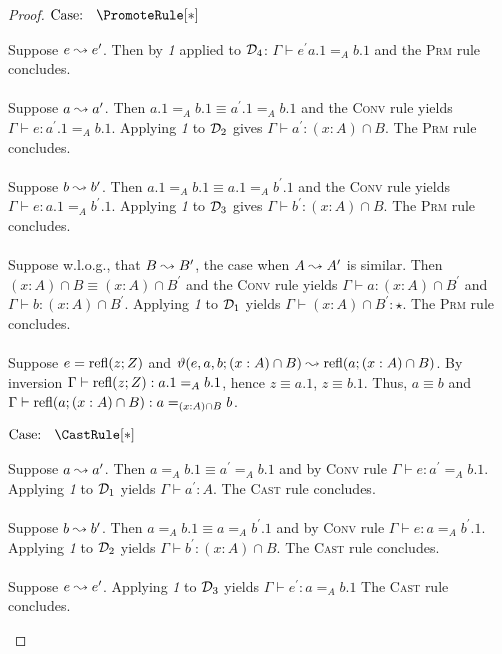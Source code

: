 \begin{proof}
    $\text{Case: }\begin{array}{c} \PromoteRule[*] \end{array}$
    \begin{proofcase}
        Suppose $e \leadsto e^\prime$.
        Then by \textit{1} applied to $\mathcal{D}_{4}$: $\Gamma \vdash e^\prime a.1 =_A b.1$ and the \textsc{Prm} rule concludes.
        \\ \\
        Suppose $a \leadsto a^\prime$.
        Then $a.1 =_A b.1 \equiv a^\prime.1 =_A b.1$ and the \textsc{Conv} rule yields $\Gamma \vdash e : a^\prime.1 =_A b.1$.
        Applying \textit{1} to $\mathcal{D}_{2}$ gives $\Gamma \vdash a^\prime : (x : A) \cap B$.
        The \textsc{Prm} rule concludes.
        \\ \\
        Suppose $b \leadsto b^\prime$.
        Then $a.1 =_A b.1 \equiv a.1 =_A b^\prime.1$ and the \textsc{Conv} rule yields $\Gamma \vdash e : a.1 =_A b^\prime.1$.
        Applying \textit{1} to $\mathcal{D}_{3}$ gives $\Gamma \vdash b^\prime : (x : A) \cap B$.
        The \textsc{Prm} rule concludes.
        \\ \\
        Suppose w.l.o.g., that $B \leadsto B^\prime$, the case when $A \leadsto A^\prime$ is similar.
        Then $(x : A) \cap B \equiv (x : A) \cap B^\prime$ and the \textsc{Conv} rule yields $\Gamma \vdash a : (x : A) \cap B^\prime$ and $\Gamma \vdash b : (x : A) \cap B^\prime$.
        Applying \textit{1} to $\mathcal{D}_{1}$ yields $\Gamma \vdash (x : A) \cap B^\prime : \star$.
        The \textsc{Prm} rule concludes.
        \\ \\
        Suppose $e = \textnormal{refl}(z;Z)$ and $\vartheta(e, a, b; (x:A) \cap B) \leadsto \textnormal{refl}(a; (x : A) \cap B)$.
        By inversion $\Gamma \vdash \textnormal{refl}(z;Z) : a.1 =_A b.1$, hence $z \equiv a.1$, $z \equiv b.1$.
        Thus, $a \equiv b$ and $\Gamma \vdash \textnormal{refl}(a; (x : A) \cap B) : a =_{(x :A) \cap B} b$.
    \end{proofcase}

    $\text{Case: }\begin{array}{c} \CastRule[*] \end{array}$
    \begin{proofcase}
        Suppose $a \leadsto a^\prime$.
        Then $a =_A b.1 \equiv a^\prime =_A b.1$ and by \textsc{Conv} rule $\Gamma \vdash e : a^\prime =_A b.1$.
        Applying \textit{1} to $\mathcal{D}_{1}$ yields $\Gamma \vdash a^\prime : A$.
        The \textsc{Cast} rule concludes.
        \\ \\
        Suppose $b \leadsto b^\prime$.
        Then $a =_A b.1 \equiv a =_A b^\prime.1$ and by \textsc{Conv} rule $\Gamma \vdash e : a =_A b^\prime.1$.
        Applying \textit{1} to $\mathcal{D}_{2}$ yields $\Gamma \vdash b^\prime : (x : A) \cap B$.
        The \textsc{Cast} rule concludes.
        \\ \\
        Suppose $e \leadsto e^\prime$.
        Applying \textit{1} to $\mathcal{D}_{3}$ yields $\Gamma \vdash e^\prime : a =_A b.1$
        The \textsc{Cast} rule concludes.
    \end{proofcase}


\end{proof}
